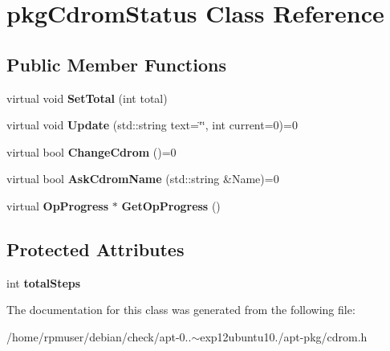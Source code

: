 \section{pkg\-Cdrom\-Status \-Class \-Reference}
\label{classpkgCdromStatus}
\subsection*{\-Public \-Member \-Functions}
\begin{DoxyCompactItemize}
\item 
virtual void {\bfseries \-Set\-Total} (int total)\label{classpkgCdromStatus_a89a757dbff2ea649c59a2318a5fc3736}

\item 
virtual void {\bfseries \-Update} (std\-::string text=\char`\"{}\char`\"{}, int current=0)=0\label{classpkgCdromStatus_a92619bb6941ed2ca67be55b8a4ac09f4}

\item 
virtual bool {\bfseries \-Change\-Cdrom} ()=0\label{classpkgCdromStatus_a39e4e477ae35bdfafcecd6b1acd716a7}

\item 
virtual bool {\bfseries \-Ask\-Cdrom\-Name} (std\-::string \&\-Name)=0\label{classpkgCdromStatus_a8c2b0f4c5306f2574a0ea2a5d7e48fbe}

\item 
virtual {\bf \-Op\-Progress} $\ast$ {\bfseries \-Get\-Op\-Progress} ()\label{classpkgCdromStatus_a725cccead63ff595aa2fc4f6210c90e7}

\end{DoxyCompactItemize}
\subsection*{\-Protected \-Attributes}
\begin{DoxyCompactItemize}
\item 
int {\bfseries total\-Steps}\label{classpkgCdromStatus_a13ec94e768d6d7dbe50f9fb8a7b0337f}

\end{DoxyCompactItemize}


\-The documentation for this class was generated from the following file\-:\begin{DoxyCompactItemize}
\item 
/home/rpmuser/debian/check/apt-\/0..$\sim$exp12ubuntu10./apt-\/pkg/cdrom.\-h\end{DoxyCompactItemize}
